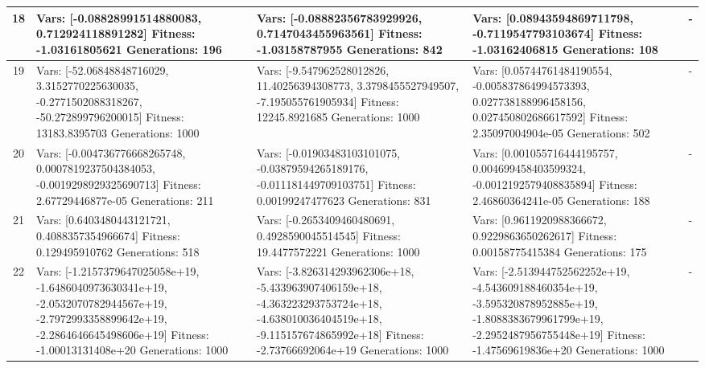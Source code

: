 \documentclass[landscape,11pt]{article}
\begin{document}
\begin{tabular}{|c|p{5.4cm}|p{5.4cm}|p{5.4cm}|p{5.4cm}|}
 \hline 
 18 & Vars: [-0.08828991514880083, 0.712924118891282] Fitness: -1.03161805621 Generations: 196 & Vars: [-0.08882356783929926, 0.7147043455963561] Fitness: -1.03158787955 Generations: 842 & Vars: [0.08943594869711798, -0.7119547793103674] Fitness: -1.03162406815 Generations: 108 & - \\
 \hline 
 19 & Vars: [-52.06848848716029, 3.3152770225630035, -0.2771502088318267, -50.272899796200015] Fitness: 13183.8395703 Generations: 1000 & Vars: [-9.547962528012826, 11.40256394308773, 3.3798455527949507, -7.195055761905934] Fitness: 12245.8921685 Generations: 1000 & Vars: [0.05744761484190554, -0.005837864994573393, 0.027738188996458156, 0.027450802686617592] Fitness: 2.35097004904e-05 Generations: 502 & - \\
 \hline 
 20 & Vars: [-0.004736776668265748, 0.0007819237504384053, -0.0019298929325690713] Fitness: 2.67729446877e-05 Generations: 211 & Vars: [-0.01903483103101075, -0.03879594265189176, -0.011181449709103751] Fitness: 0.00199247477623 Generations: 831 & Vars: [0.001055716444195757, 0.004699458403599324, -0.0012192579408835894] Fitness: 2.46860364241e-05 Generations: 188 & - \\
 \hline 
 21 & Vars: [0.6403480443121721, 0.4088357354966674] Fitness: 0.129495910762 Generations: 518 & Vars: [-0.2653409460480691, 0.4928590045514545] Fitness: 19.4477572221 Generations: 1000 & Vars: [0.9611920988366672, 0.9229863650262617] Fitness: 0.00158775415384 Generations: 175 & - \\
 \hline 
 22 & Vars: [-1.2157379647025058e+19, -1.6486040973630341e+19, -2.0532070782944567e+19, -2.7972993358899642e+19, -2.2864646645498606e+19] Fitness: -1.00013131408e+20 Generations: 1000 & Vars: [-3.826314293962306e+18, -5.433963907406159e+18, -4.363223293753724e+18, -4.638010036404519e+18, -9.115157674865992e+18] Fitness: -2.73766692064e+19 Generations: 1000 & Vars: [-2.513944752562252e+19, -4.543609188460354e+19, -3.595320878952885e+19, -1.8088383679961799e+19, -2.2952487956755448e+19] Fitness: -1.47569619836e+20 Generations: 1000 & - \\
 \hline 

\end{tabular}
\end{document}
